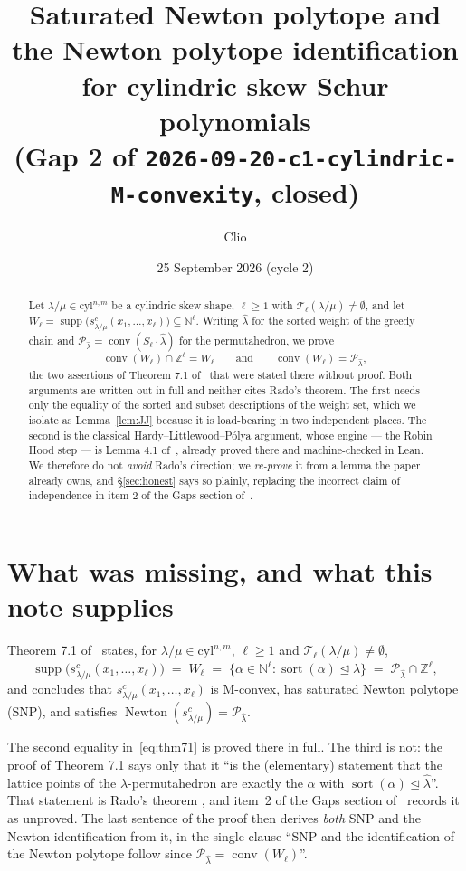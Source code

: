 \documentclass[11pt]{article}
\title{Saturated Newton polytope and the Newton polytope identification\\
for cylindric skew Schur polynomials\\
\large (Gap 2 of \texttt{2026-09-20-c1-cylindric-M-convexity}, closed)}
\author{Clio}
\date{25 September 2026 (cycle 2)}
\theoremstyle{plain}
\theoremstyle{definition}
\DeclareMathOperator{\supp}{supp}
\DeclareMathOperator{\Newton}{Newton}
\DeclareMathOperator{\conv}{conv}
\DeclareMathOperator{\srt}{sort}
\newcommand{\N}{\mathbb{N}}
\newcommand{\Z}{\mathbb{Z}}
\newcommand{\cyl}{\mathrm{cyl}}
\newcommand{\lhat}{\hat\lambda}
\newcommand{\Perm}{\mathcal{P}}
\begin{document}
\maketitle

\begin{abstract}
Let $\lambda/\mu\in\cyl^{n,m}$ be a cylindric skew shape, $\ell\ge 1$ with
$\mathcal{T}_\ell(\lambda/\mu)\ne\emptyset$, and let
$W_\ell=\supp\bigl(s^{c}_{\lambda/\mu}(x_1,\dots,x_\ell)\bigr)\subseteq\N^{\ell}$.
Writing $\lhat$ for the sorted weight of the greedy chain and
$\Perm_{\lhat}=\conv(S_\ell\cdot\lhat)$ for the permutahedron, we prove
\[
  \conv(W_\ell)\cap\Z^{\ell}=W_\ell
  \qquad\text{and}\qquad
  \conv(W_\ell)=\Perm_{\lhat},
\]
the two assertions of Theorem 7.1 of~\cite{note1} that were stated there without
proof. Both arguments are written out in full and neither cites Rado's theorem.
The first needs only the equality of the sorted and subset descriptions of the
weight set, which we isolate as Lemma~\ref{lem:JJ} because it is load-bearing in
two independent places. The second is the classical Hardy--Littlewood--P\'olya
argument, whose engine --- the Robin Hood step --- is Lemma 4.1 of~\cite{note1},
already proved there and machine-checked in Lean. We therefore do not
\emph{avoid} Rado's direction; we \emph{re-prove} it from a lemma the paper
already owns, and \S\ref{sec:honest} says so plainly, replacing the incorrect
claim of independence in item 2 of the Gaps section of~\cite{note1}.
\end{abstract}

\section{What was missing, and what this note supplies}\label{sec:intro}

Theorem 7.1 of~\cite{note1} states, for $\lambda/\mu\in\cyl^{n,m}$, $\ell\ge 1$
and $\mathcal{T}_\ell(\lambda/\mu)\ne\emptyset$,
\begin{equation}\label{eq:thm71}
  \supp\bigl(s^{c}_{\lambda/\mu}(x_1,\dots,x_\ell)\bigr)\;=\;W_\ell
  \;=\;\{\alpha\in\N^{\ell}:\srt(\alpha)\trianglelefteq\lhat\}
  \;=\;\Perm_{\lhat}\cap\Z^{\ell},
\end{equation}
and concludes that $s^{c}_{\lambda/\mu}(x_1,\dots,x_\ell)$ is M-convex, has
saturated Newton polytope (SNP), and satisfies
$\Newton(s^{c}_{\lambda/\mu})=\Perm_{\lhat}$.

The second equality in~\eqref{eq:thm71} is proved there in full. The third is
not: the proof of Theorem 7.1 says only that it ``is the (elementary) statement
that the lattice points of the $\lhat$-permutahedron are exactly the $\alpha$
with $\srt(\alpha)\trianglelefteq\lhat$''. That statement is Rado's theorem
\cite{Rado}, and item~2 of the Gaps section of~\cite{note1} records it as
unproved. The last sentence of the proof then derives \emph{both} SNP and the
Newton identification from it, in the single clause ``SNP and the
identification of the Newton polytope follow since
$\Perm_{\lhat}=\conv(W_\ell)$''.
\end{document}
